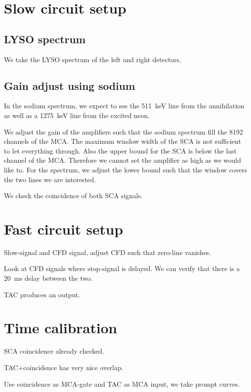 \documentclass[11pt, english, fleqn, DIV=15, headinclude, BCOR=2cm]{scrreprt}
\begin{document}
\section{Slow circuit setup}

\subsection{LYSO spectrum}

We take the LYSO spectrum of the left and right detectors.

\subsection{Gain adjust using sodium}

In the sodium spectrum, we expect to see the \SI{511}{\kilo\electronvolt} line
from the annihilation as well as a \SI{1275}{\kilo\electronvolt} line from the
excited neon.

We adjust the gain of the amplifiers such that the sodium spectrum fill the
8192 channels of the MCA\@. The maximum window width of the SCA is not
sufficient to let everything through. Also the upper bound for the SCA is below
the last channel of the MCA\@. Therefore we cannot set the amplifier as high as
we would like to. For the spectrum, we adjust the lower bound such that the
window covers the two lines we are interested.

We check the coincidence of both SCA signals.

\section{Fast circuit setup}

Slow-signal and CFD signal, adjust CFD such that zero-line vanishes.

Look at CFD signals where stop-signal is delayed. We can verify that there is a
\SI{20}{\milli\second} delay between the two.

TAC produces an output.

\section{Time calibration}

SCA coincidence already checked.

TAC+coincidence has very nice overlap.

Use coincidence as MCA-gate and TAC as MCA input, we take prompt curves.
\end{document}
